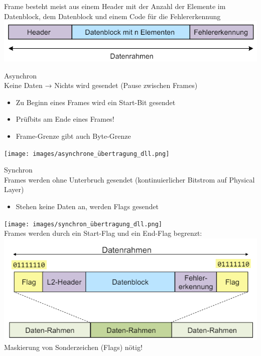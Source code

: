 \begin{definition}{Frame}
    besteht meist aus einem Header mit der Anzahl der Elemente im Datenblock, dem Datenblock und einem Code für die Fehlererkennung\\
    \includegraphics[width=0.6\linewidth]{images/frame_def.png}
\end{definition}

\begin{concept}{Asynchron}\\
    Keine Daten → Nichts wird gesendet (Pause zwischen Frames)
    \begin{itemize}
        \item Zu Beginn eines Frames wird ein Start-Bit gesendet
        \item Prüfbits am Ende eines Frames!
        \item Frame-Grenze gibt auch Byte-Grenze
    \end{itemize}
    \texttt{[image: images/asynchrone\_übertragung\_dll.png]}
\end{concept}

\begin{concept}{Synchron}\\
    Frames werden ohne Unterbruch gesendet (kontinuierlicher Bitstrom auf Physical Layer)
    \begin{itemize}
        \item Stehen keine Daten an, werden Flags gesendet
    \end{itemize}
    \texttt{[image: images/synchron\_übertragung\_dll.png]}\\
    Frames werden durch ein Start-Flag und ein End-Flag begrenzt:\\
    \includegraphics[width=0.6\linewidth]{images/flags_frames.png}\\
    Maskierung von Sonderzeichen (Flags) nötig!
\end{concept}

